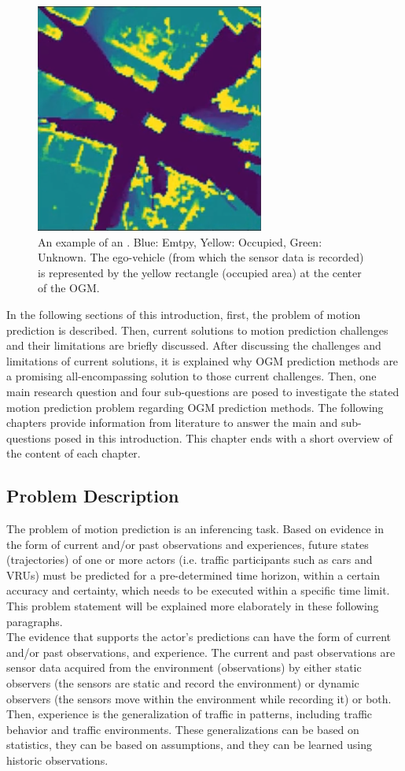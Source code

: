 \begin{figure}[h]
	\centering
	\includegraphics[width=0.4\linewidth]{Figures/Title_Page_OGM}
	\caption{An example of an . Blue: Emtpy, Yellow: Occupied, Green: Unknown. The ego-vehicle (from which the sensor data is recorded) is represented by the yellow rectangle (occupied area) at the center of the \gls{OGM}.}
	\label{fig:ogm_example}
\end{figure}


In the following sections of this introduction, first, the problem of motion prediction is described. Then, current solutions to motion prediction challenges and their limitations are briefly discussed. After discussing the challenges and limitations of current solutions, it is explained why \gls{OGM} prediction methods are a promising all-encompassing solution to those current challenges. Then, one main research question and four sub-questions are posed to investigate the stated motion prediction problem regarding \gls{OGM} prediction methods. The following chapters provide information from literature to answer the main and sub-questions posed in this introduction. This chapter ends with a short overview of the content of each chapter.

\subsection{Problem Description} 
The problem of motion prediction is an inferencing task. Based on evidence in the form of current and/or past observations and experiences, future states (trajectories) of one or more actors (i.e. traffic participants such as cars and \glspl{VRU}) must be predicted for a pre-determined time horizon, within a certain accuracy and certainty, which needs to be executed within a specific time limit. This problem statement will be explained more elaborately in these following paragraphs. \\

The evidence that supports the actor's predictions can have the form of current and/or past observations, and experience. The current and past observations are sensor data acquired from the environment (observations) by either static observers (the sensors are static and record the environment) or dynamic observers (the sensors move within the environment while recording it) or both.
Then, experience is the generalization of traffic in patterns, including traffic behavior and traffic environments. These generalizations can be based on statistics, they can be based on assumptions, and they can be learned using historic observations. \\

